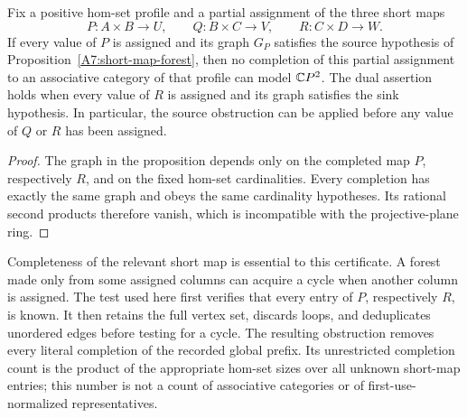 \begin{corollary}
\label{A7:short-map-forest-prefix}
Fix a positive hom-set profile and a partial assignment of the
three short maps
\[
 P:A\times B\to U,\qquad Q:B\times C\to V,
 \qquad R:C\times D\to W.
\]
If every value of $P$ is assigned and its graph $G_P$ satisfies
the source hypothesis of Proposition~\ref{A7:short-map-forest},
then no completion of this partial assignment to an associative
category of that profile can model $\mathbb{C}P^2$.
The dual assertion holds when every value of $R$ is assigned and
its graph satisfies the sink hypothesis. In particular, the
source obstruction can be applied before any value of $Q$ or $R$
has been assigned.
\end{corollary}
\begin{proof}
The graph in the proposition depends only on the completed map
$P$, respectively $R$, and on the fixed hom-set cardinalities.
Every completion has exactly the same graph and obeys the same
cardinality hypotheses. Its rational second products therefore
vanish, which is incompatible with the projective-plane ring.
\end{proof}

\begin{remark*}
Completeness of the relevant short map is essential to this
certificate. A forest made only from some assigned columns can
acquire a cycle when another column is assigned. The test used
here first verifies that every entry of $P$, respectively $R$,
is known. It then retains the full vertex set, discards loops,
and deduplicates unordered edges before testing for a cycle.
The resulting obstruction removes every literal completion of
the recorded global prefix. Its unrestricted completion count
is the product of the appropriate hom-set sizes over all unknown
short-map entries; this number is not a count of associative
categories or of first-use-normalized representatives.
\end{remark*}
